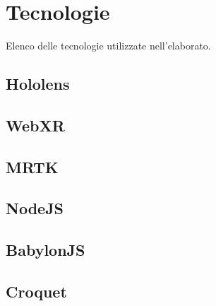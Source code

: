 \section{Tecnologie}\label{sec:Tecnologie}

Elenco delle tecnologie utilizzate nell'elaborato.
\subsection{Hololens}\label{ssec:Hololens}
\subsection{WebXR}\label{ssec:WebXR}
\subsection{MRTK}\label{ssec:MRTK}
\subsection{NodeJS}\label{ssec:NodeJS}
\subsection{BabylonJS}\label{ssec:BabylonJS}
\subsection{Croquet}\label{ssec:Croquet}

\newpage